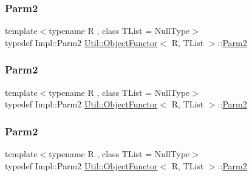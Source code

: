 \mbox{\label{classUtil_1_1ObjectFunctor_a6809cf65883dc7575e01d9b9849649cf}} 
\subsubsection{\texorpdfstring{Parm2}{Parm2}\hspace{0.1cm}{\footnotesize\ttfamily [1/3]}}
{\footnotesize\ttfamily template$<$typename R , class T\+List  = Null\+Type$>$ \\
typedef Impl\+::\+Parm2 \mbox{\hyperlink{classUtil_1_1ObjectFunctor}{Util\+::\+Object\+Functor}}$<$ R, T\+List $>$\+::\mbox{\hyperlink{classUtil_1_1ObjectFunctor_a6809cf65883dc7575e01d9b9849649cf}{Parm2}}}

\mbox{\label{classUtil_1_1ObjectFunctor_a6809cf65883dc7575e01d9b9849649cf}} 
\subsubsection{\texorpdfstring{Parm2}{Parm2}\hspace{0.1cm}{\footnotesize\ttfamily [2/3]}}
{\footnotesize\ttfamily template$<$typename R , class T\+List  = Null\+Type$>$ \\
typedef Impl\+::\+Parm2 \mbox{\hyperlink{classUtil_1_1ObjectFunctor}{Util\+::\+Object\+Functor}}$<$ R, T\+List $>$\+::\mbox{\hyperlink{classUtil_1_1ObjectFunctor_a6809cf65883dc7575e01d9b9849649cf}{Parm2}}}

\mbox{\label{classUtil_1_1ObjectFunctor_a6809cf65883dc7575e01d9b9849649cf}} 
\subsubsection{\texorpdfstring{Parm2}{Parm2}\hspace{0.1cm}{\footnotesize\ttfamily [3/3]}}
{\footnotesize\ttfamily template$<$typename R , class T\+List  = Null\+Type$>$ \\
typedef Impl\+::\+Parm2 \mbox{\hyperlink{classUtil_1_1ObjectFunctor}{Util\+::\+Object\+Functor}}$<$ R, T\+List $>$\+::\mbox{\hyperlink{classUtil_1_1ObjectFunctor_a6809cf65883dc7575e01d9b9849649cf}{Parm2}}}


